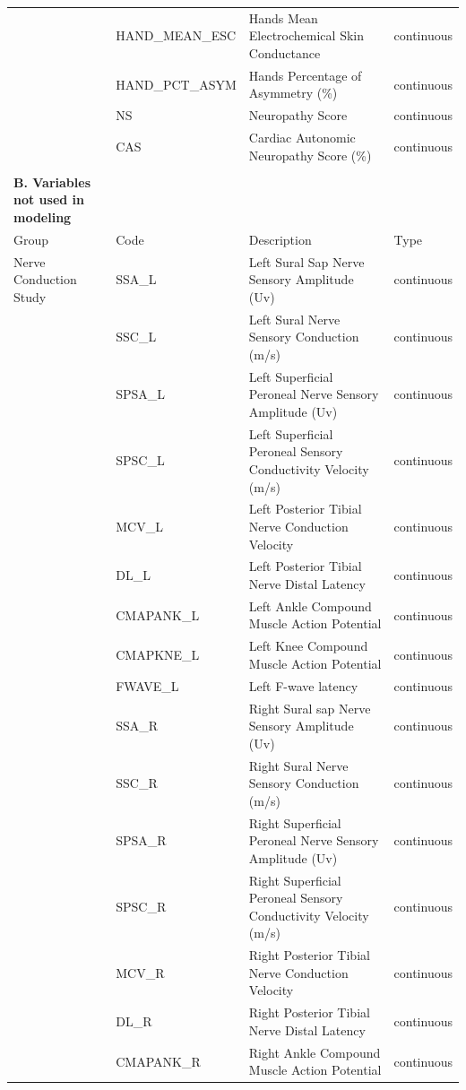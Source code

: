 \documentclass[pdflatex,sn-vancouver-num]{sn-jnl}
\begin{document}
\begin{table}[h!]
\begin{tabular}{llll}
         & HAND\_MEAN\_ESC & Hands Mean Electrochemical Skin Conductance & continuous  \\
         & HAND\_PCT\_ASYM & Hands Percentage of Asymmetry (\%) & continuous  \\
         & NS & Neuropathy Score & continuous  \\
         & CAS & Cardiac Autonomic Neuropathy Score (\%) & continuous  \\
 &  &   & \\
\midrule
\textbf{B. Variables not used in modeling} & & & \\
\midrule
\hspace{0.3cm} Group & Code & Description  & Type\\
\midrule
\hspace{0.3cm} Nerve Conduction Study & SSA\_L & Left Sural Sap Nerve Sensory Amplitude (Uv)  & continuous \\
 & SSC\_L & Left Sural Nerve Sensory Conduction (m/s)  & continuous \\
 & SPSA\_L & Left Superficial Peroneal Nerve Sensory Amplitude (Uv)  & continuous \\
 & SPSC\_L & Left Superficial Peroneal Sensory Conductivity Velocity (m/s)  & continuous \\
 & MCV\_L & Left Posterior Tibial Nerve Conduction Velocity  & continuous \\
 & DL\_L & Left Posterior Tibial Nerve Distal Latency  & continuous \\
 & CMAPANK\_L & Left Ankle Compound Muscle Action Potential  & continuous \\
 & CMAPKNE\_L & Left Knee Compound Muscle Action Potential  & continuous \\
 & FWAVE\_L & Left F-wave latency  & continuous \\
 & SSA\_R & Right Sural sap Nerve Sensory Amplitude (Uv)  & continuous \\
 & SSC\_R & Right Sural Nerve Sensory Conduction (m/s)  & continuous \\
 & SPSA\_R & Right Superficial Peroneal Nerve Sensory Amplitude (Uv) & continuous  \\
 & SPSC\_R & Right Superficial Peroneal Sensory Conductivity Velocity (m/s) & continuous  \\
 & MCV\_R & Right Posterior Tibial Nerve Conduction Velocity & continuous  \\
 & DL\_R & Right Posterior Tibial Nerve Distal Latency & continuous  \\
 & CMAPANK\_R & Right Ankle Compound Muscle Action Potential & continuous  \\

\end{tabular}
\end{table}
\end{document}
